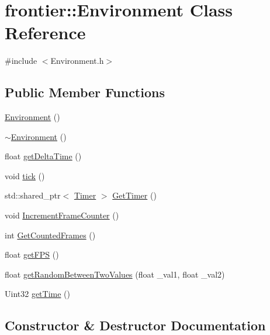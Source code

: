 \hypertarget{classfrontier_1_1_environment}{}\section{frontier\+:\+:Environment Class Reference}
\label{classfrontier_1_1_environment}


{\ttfamily \#include $<$Environment.\+h$>$}

\subsection*{Public Member Functions}
\begin{DoxyCompactItemize}
\item 
\hyperlink{classfrontier_1_1_environment_a5134f0589b326bb3ca0dad342c11b8f4}{Environment} ()
\item 
\hyperlink{classfrontier_1_1_environment_a3001ee2f0a1b096a66e9d6604975bc3f}{$\sim$\+Environment} ()
\item 
float \hyperlink{classfrontier_1_1_environment_ad1daf8c37ed11d5170f292232302316e}{get\+Delta\+Time} ()
\item 
void \hyperlink{classfrontier_1_1_environment_aff2fa80de7560311e4b6fd5b74d8583e}{tick} ()
\item 
std\+::shared\+\_\+ptr$<$ \hyperlink{classfrontier_1_1_timer}{Timer} $>$ \hyperlink{classfrontier_1_1_environment_a1e5a50e5f54b908516a24b02672ebab0}{Get\+Timer} ()
\item 
void \hyperlink{classfrontier_1_1_environment_a8cc8f5708b26f9366e620d13bb031e42}{Increment\+Frame\+Counter} ()
\item 
int \hyperlink{classfrontier_1_1_environment_af1b717849524c097aedcfab50333bb2b}{Get\+Counted\+Frames} ()
\item 
float \hyperlink{classfrontier_1_1_environment_a53675d0c40ce44c64a9b2439b1753255}{get\+F\+PS} ()
\item 
float \hyperlink{classfrontier_1_1_environment_a5e5f66deca65c473b583871b769ed1d6}{get\+Random\+Between\+Two\+Values} (float \+\_\+val1, float \+\_\+val2)
\item 
Uint32 \hyperlink{classfrontier_1_1_environment_aa98bd35f83903e58f59ffc08dc7d2b2d}{get\+Time} ()
\end{DoxyCompactItemize}


\subsection{Constructor \& Destructor Documentation}
\mbox{\label{classfrontier_1_1_environment_a5134f0589b326bb3ca0dad342c11b8f4}} 
